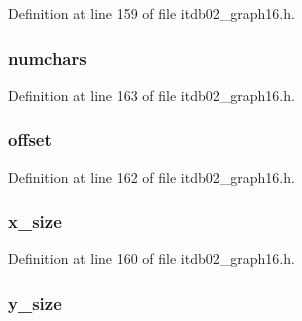 Definition at line 159 of file itdb02\-\_\-graph16.\-h.

\hypertarget{struct__current__font_af1102643a0ac0e61d187236dcf9adedf}{
\subsubsection[{numchars}]{ numchars}}\label{struct__current__font_af1102643a0ac0e61d187236dcf9adedf}


Definition at line 163 of file itdb02\-\_\-graph16.\-h.

\hypertarget{struct__current__font_aa9fff43968831437a312428836cab362}{
\subsubsection[{offset}]{ offset}}\label{struct__current__font_aa9fff43968831437a312428836cab362}


Definition at line 162 of file itdb02\-\_\-graph16.\-h.

\hypertarget{struct__current__font_ab94ee1fb70d71eebd93cc53fe572aefb}{
\subsubsection[{x\-\_\-size}]{ x\-\_\-size}}\label{struct__current__font_ab94ee1fb70d71eebd93cc53fe572aefb}


Definition at line 160 of file itdb02\-\_\-graph16.\-h.

\hypertarget{struct__current__font_a8aa64d195e472d3ca86416f9c2d7587c}{
\subsubsection[{y\-\_\-size}]{ y\-\_\-size}}\label{struct__current__font_a8aa64d195e472d3ca86416f9c2d7587c}


